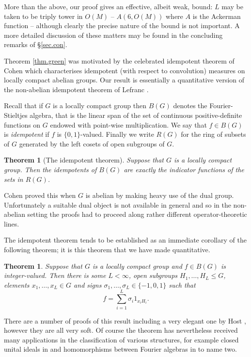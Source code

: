\documentclass[12pt]{amsart}
\numberwithin{equation}{section}
\theoremstyle{plain}
\newtheorem{theorem}[subsection]{Theorem}
\theoremstyle{definition}
\renewcommand{\leq}{\leqslant}
\begin{document}
More than the above, our proof gives an effective, albeit weak, bound: $L$ may be taken to be triply tower in $O(M)$ -- $A(6,O(M))$ where $A$ is the Ackerman function -- although clearly the precise nature of the bound is not important.  A more detailed discussion of these matters may be found in the concluding remarks of \S\ref{sec.con}.

Theorem \ref{thm.green} was motivated by the celebrated idempotent theorem of Cohen \cite{PJC} which characterises idempotent (with respect to convolution) measures on locally compact abelian groups.  Our result is essentially a quantitative version of the non-abelian idempotent theorem of Lefranc \cite{ML}.

Recall that if $G$ is a locally compact group then $B(G)$ denotes the Fourier-Stieltjes algebra, that is the linear span of the set of continuous positive-definite functions on $G$ endowed with point-wise multiplication.  We say that $f \in B(G)$ is \emph{idempotent} if $f$ is $\{0,1\}$-valued.  Finally we write $R(G)$ for the ring of subsets of $G$ generated by the left cosets of open subgroups of $G$.
\begin{theorem}[The idempotent theorem]
Suppose that $G$ is a locally compact group. Then the idempotents of $B(G)$ are exactly the indicator functions of the sets in $R(G)$.
\end{theorem}
Cohen proved this when $G$ is abelian by making heavy use of the dual group.  Unfortunately a suitable dual object is not available in general and so in the non-abelian setting the proofs had to proceed along rather different operator-theoretic lines.

The idempotent theorem tends to be established as an immediate corollary of the following theorem; it is this theorem that we have made quantitative.
\begin{theorem}\label{thm.lefranc}
Suppose that $G$ is a locally compact group and $f \in B(G)$ is integer-valued. Then there is some $L<\infty$, open subgroups $H_1,\dots,H_{L} \leq G$, elements $x_1,\dots,x_{L} \in G$ and signs $\sigma_1,\dots,\sigma_L\in \{-1,0,1\}$ such that
\begin{equation*}
f = \sum_{i=1}^L{\sigma_i1_{x_iH_i}}.
\end{equation*}
\end{theorem}
There are a number of proofs of this result including a very elegant one by Host \cite{BH}, however they are all very soft.  Of course the theorem has nevertheless received many applications in the classification of various structures, for example closed unital ideals in \cite{AU} and homomorphisms between Fourier algebras in \cite{MINS} to name two.
\end{document}
